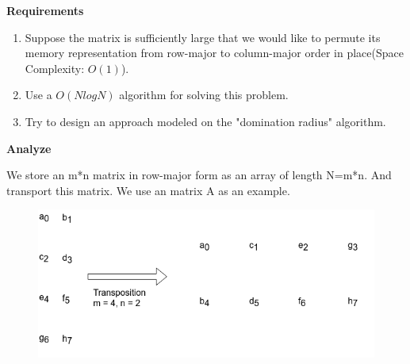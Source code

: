 \begin{homeworkProblem}



\textbf{Requirements}
    \begin{enumerate}
        \item Suppose the matrix is sufficiently large that we would like to permute its memory representation from row-major to column-major order in place(Space Complexity: $O(1)$).
        \item Use a $O(NlogN)$ algorithm for solving this problem.
        \item Try to design an approach modeled on the "domination radius" algorithm.
    \end{enumerate}

\textbf{Analyze}

We store an m*n matrix in row-major form as an array of length N=m*n. And transport this matrix. We use an matrix A as an example.  \\
\begin{figure}[h]
\centering
\includegraphics[scale=0.7]{images/1.png}
\end{figure}


\end{homeworkProblem}
